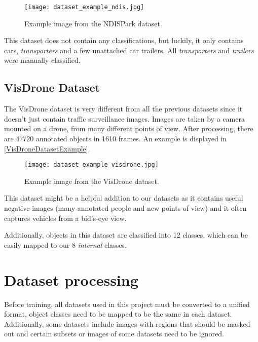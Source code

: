 \begin{figure}[h]
    \centering
    \texttt{[image: dataset\_example\_ndis.jpg]}
    \caption{Example image from the NDISPark dataset.}
    \label{NDISDatasetExample}
\end{figure}

This dataset does not contain any classifications, but luckily, it only contains
cars, \textit{transporters} and a few unattached car trailers. All
\textit{transporters} and \textit{trailers} were manually classified.


\subsection{VisDrone Dataset}

The VisDrone dataset \cite{Zhu2022} is very different from all the previous
datasets since it doesn't just contain traffic surveillance images. Images are
taken by a camera mounted on a drone, from many different points of view. After
processing, there are \num{47720} annotated objects in \num{1610} frames. An
example is displayed in \autoref{VisDroneDatasetExample}.

\begin{figure}[h]
    \centering
    \texttt{[image: dataset\_example\_visdrone.jpg]}
    \caption{Example image from the VisDrone dataset.}
    \label{VisDroneDatasetExample}
\end{figure}

This dataset might be a helpful addition to our datasets as it contains useful
negative images (many annotated people and new points of view) and it often
captures vehicles from a bid's-eye view.

Additionally, objects in this dataset are classified into 12 classes, which can
be easily mapped to our 8 \textit{internal} classes.


\section{Dataset processing}


Before training, all datasets used in this project must be converted to a
unified format, object classes need to be mapped to be the same in each dataset.
Additionally, some datasets include images with regions that should be masked
out and certain subsets or images of some datasets need to be ignored.

